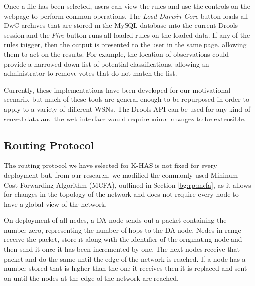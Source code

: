 	Once a file has been selected, users can view the rules and use the controls on the webpage to perform common operations. The \textit{Load Darwin Core} button loads all DwC archives that are stored in the MySQL database into the current Drools session and the \textit{Fire} button runs all loaded rules on the loaded data. If any of the rules trigger, then the output is presented to the user in the same page, allowing them to act on the results. For example, the location of observations could provide a narrowed down list of potential classifications, allowing an administrator to remove votes that do not match the list.

	\DIFaddbegin {}\textit{} 

	\DIFaddend Currently, these implementations have been developed for our motivational scenario, but much of these tools are general enough to be repurposed in order to apply to a variety of different WSNs. The Drools API can be used for any kind of sensed data and the web interface would require minor changes to be extensible.

	\subsection{Routing Protocol}\label{arch:routing}
		The routing protocol we have selected for K-HAS is not fixed for every deployment but, from our research, we modified the commonly used Mininum Cost Forwarding Algorithm (MCFA), outlined in Section \ref{bg:rp:mcfa}, as it allows for changes in the topology of the network and does not require every node to have a global view of the network.

		On deployment of all nodes, a DA node sends out a packet containing the number zero, representing the number of hops to the DA node. Nodes in range receive the packet, store it along with the identifier of the originating node and then send it once it has been incremented by one. The next nodes receive that packet and do the same until the edge of the network is reached. If a node has a number stored that is higher than the one it receives then it is replaced and sent on until the nodes at the edge of the network are reached.


